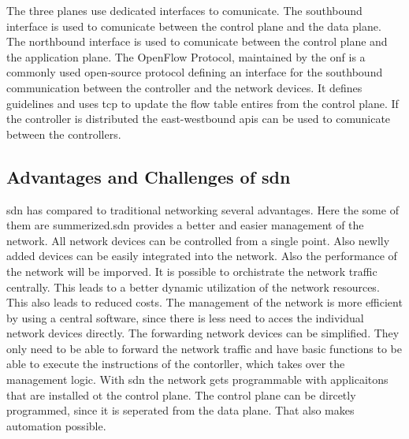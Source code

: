 \documentclass[conference]{IEEEtran}
\begin{document}
	The three planes use dedicated interfaces to comunicate. The southbound interface is used to comunicate between the control plane and the data plane. The northbound interface is used to comunicate between the control plane and the application plane. The OpenFlow Protocol, maintained by the \ac{onf} is a commonly used open-source protocol defining an interface for the southbound communication between the controller and the network devices. It defines guidelines and uses \ac{tcp} to update the flow table entires from the control plane. 
	If the controller is distributed the east-westbound \acp{api} can be used to comunicate between the controllers. \cite{nunez2023briefoverviewsoftwaredefinednetworking}


	\subsection{Advantages and Challenges of \ac{sdn}}

	\acf{sdn} has compared to traditional networking several advantages. Here the some of them are summerized.\ac{sdn} provides a better and easier management of the network. All network devices can be controlled from a single point. Also newlly added devices can be easily integrated into the network. \cite{Jefia2018-pj}
	Also the performance of the network will be imporved. It is possible to orchistrate the network traffic centrally. This leads to a better dynamic utilization of the network resources. This also leads to reduced costs. The management of the network is more efficient by using a central software, since there is less need to acces the individual network devices directly. \cite{Jefia2018-pj}
	The forwarding network devices can be simplified. They only need to be able to forward the network traffic and have basic functions to be able to execute the instructions of the contorller, which takes over the management logic. \cite{Hussain2022-tc} With \ac{sdn} the network gets programmable with applicaitons that are installed ot the control plane. The control plane can be dircetly programmed, since it is seperated from the data plane. That also makes automation possible. \cite{Hussain2022-tc}
\end{document}
